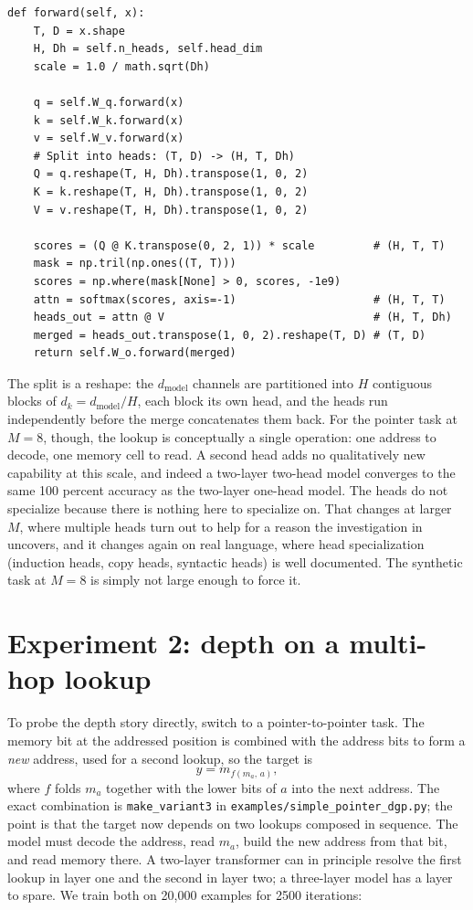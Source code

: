 \begin{lstlisting}
def forward(self, x):
    T, D = x.shape
    H, Dh = self.n_heads, self.head_dim
    scale = 1.0 / math.sqrt(Dh)

    q = self.W_q.forward(x)
    k = self.W_k.forward(x)
    v = self.W_v.forward(x)
    # Split into heads: (T, D) -> (H, T, Dh)
    Q = q.reshape(T, H, Dh).transpose(1, 0, 2)
    K = k.reshape(T, H, Dh).transpose(1, 0, 2)
    V = v.reshape(T, H, Dh).transpose(1, 0, 2)

    scores = (Q @ K.transpose(0, 2, 1)) * scale         # (H, T, T)
    mask = np.tril(np.ones((T, T)))
    scores = np.where(mask[None] > 0, scores, -1e9)
    attn = softmax(scores, axis=-1)                     # (H, T, T)
    heads_out = attn @ V                                # (H, T, Dh)
    merged = heads_out.transpose(1, 0, 2).reshape(T, D) # (T, D)
    return self.W_o.forward(merged)
\end{lstlisting}

The split is a reshape: the $d_{\text{model}}$ channels are partitioned into
$H$ contiguous blocks of $d_k = d_{\text{model}} / H$, each block its own
head, and the heads run independently before the merge concatenates them back.
For the pointer task at $M=8$, though, the lookup is conceptually a single
operation: one address to decode, one memory cell to read. A second head adds
no qualitatively new capability at this scale, and indeed a two-layer
two-head model converges to the same 100 percent accuracy as the two-layer
one-head model. The heads do not specialize because there is nothing here to
specialize on. That changes at larger $M$, where multiple heads turn out to
help for a reason the investigation in  uncovers,
and it changes again on real language, where head specialization (induction
heads, copy heads, syntactic heads) is well documented. The synthetic task at
$M=8$ is simply not large enough to force it.

\section{Experiment 2: depth on a multi-hop lookup}\label{sec:exp-multihop}

To probe the depth story directly, switch to a pointer-to-pointer task. The
memory bit at the addressed position is combined with the address bits to form
a \emph{new} address, used for a second lookup, so the target is
\[
  y = m_{f(m_a,\, a)} ,
\]
where $f$ folds $m_a$ together with the lower bits of $a$ into the next
address. The exact combination is \texttt{make\_variant3} in
\texttt{examples/simple\_pointer\_dgp.py}; the point is that the target now
depends on two lookups composed in sequence. The model must decode the
address, read $m_a$, build the new address from that bit, and read memory
there. A two-layer transformer can in principle resolve the first lookup in
layer one and the second in layer two; a three-layer model has a layer to
spare. We train both on 20{,}000 examples for 2500 iterations:

